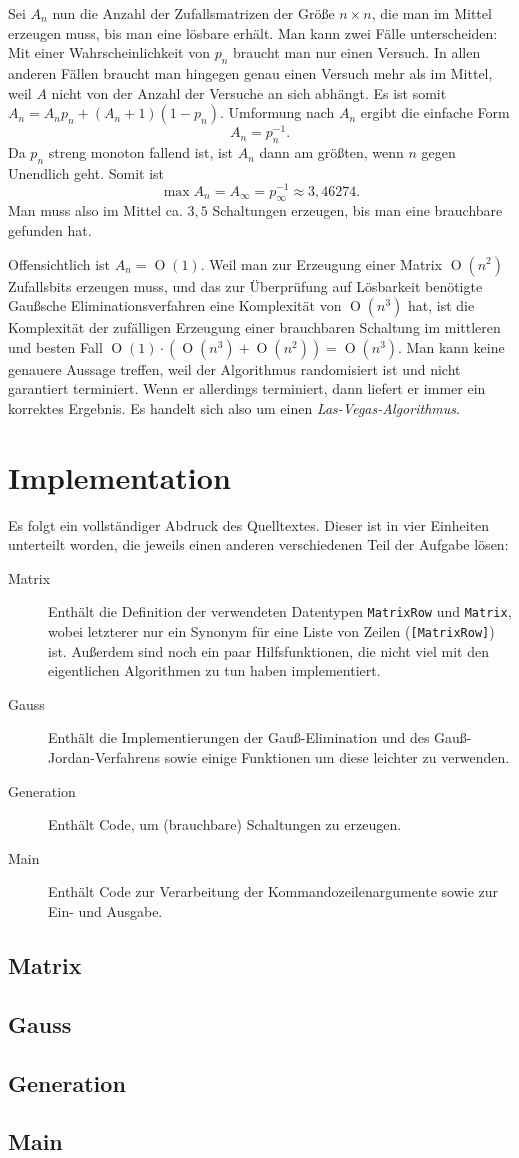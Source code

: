 \documentclass{scrartcl}
\DeclareMathOperator{\bigO}{O}
\begin{document}
Sei $A_n$ nun die Anzahl der Zufallsmatrizen der Größe $n\times n$, die man im
Mittel erzeugen muss, bis man eine lösbare erhält. Man kann zwei Fälle
unterscheiden: Mit einer Wahrscheinlichkeit von $p_n$ braucht man nur einen
Versuch. In allen anderen Fällen braucht man hingegen genau einen Versuch mehr
als im Mittel, weil $A$ nicht von der Anzahl der Versuche an sich abhängt. Es
ist somit $A_n=A_np_n+(A_n+1)(1-p_n)$. Umformung nach $A_n$ ergibt die
einfache Form
\begin{equation}
A_n=p_n^{-1}.
\end{equation}
Da $p_n$ streng monoton fallend ist, ist $A_n$ dann am größten, wenn $n$ gegen
Unendlich geht. Somit ist
\begin{equation}
\max A_n = A_\infty = p_\infty^{-1} \approx 3{,}46274.
\end{equation}
Man muss also im Mittel ca. $3{,}5$ Schaltungen erzeugen, bis man eine
brauchbare gefunden hat.

Offensichtlich ist $A_n=\bigO(1)$. Weil man zur Erzeugung einer Matrix $\bigO(n^
2)$ Zufallsbits erzeugen muss, und das zur Überprüfung auf Lösbarkeit benötigte
Gaußsche Eliminationsverfahren eine Komplexität von $\bigO(n^3)$ hat, ist die
Komplexität der zufälligen Erzeugung einer brauchbaren Schaltung im mittleren
und besten Fall $\bigO(1)\cdot\left(\bigO(n^3)+\bigO(n^2)\right)=\bigO(n^3)$.
Man kann keine genauere Aussage treffen, weil der Algorithmus randomisiert ist
und nicht garantiert terminiert. Wenn er allerdings terminiert, dann liefert er
immer ein korrektes Ergebnis. Es handelt sich also um einen
\emph{Las-Vegas-Algorithmus}.

\section{Implementation}
Es folgt ein vollständiger Abdruck des Quelltextes. Dieser ist in vier Einheiten
unterteilt worden, die jeweils einen anderen verschiedenen Teil der Aufgabe
lösen:

\begin{description}
\item[Matrix] Enthält die Definition der verwendeten Datentypen \texttt
  {MatrixRow} und \texttt{Matrix}, wobei letzterer nur ein Synonym für eine
  Liste von Zeilen (\texttt{[MatrixRow]}) ist. Außerdem sind noch ein paar
  Hilfsfunktionen, die nicht viel mit den eigentlichen Algorithmen zu tun haben
  implementiert.
\item[Gauss] Enthält die Implementierungen der Gauß-Elimination und des
  Gauß-Jordan-Verfahrens sowie einige Funktionen um diese leichter zu verwenden.
\item[Generation] Enthält Code, um (brauchbare) Schaltungen zu erzeugen.
\item[Main] Enthält Code zur Verarbeitung der Kommandozeilenargumente sowie zur
  Ein- und Ausgabe.
\end{description}

\newcommand{\listSec}[1]{%
  \subsection*{#1}
  
}

\listSec{Matrix}
\listSec{Gauss}
\listSec{Generation}
\listSec{Main}
\end{document}
